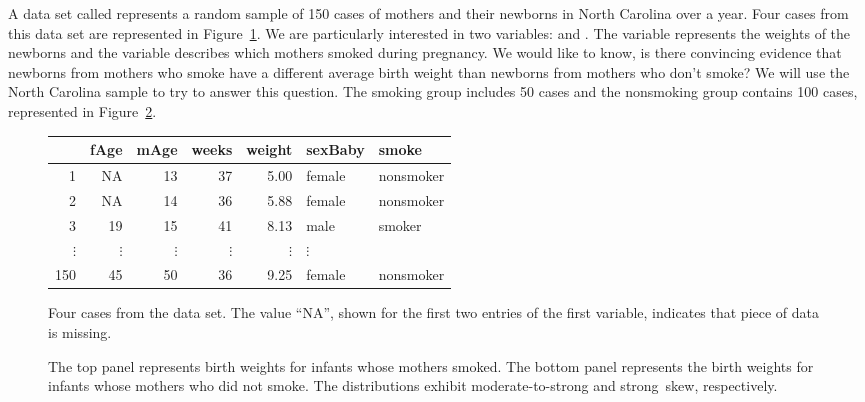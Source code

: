 
A data set called  represents a random sample of 150 cases of mothers and their newborns in North Carolina over a year. Four cases from this data set are represented in Figure~\ref{babySmokeDF}. We are particularly interested in two variables:  and . The  variable represents the weights of the newborns and the  variable describes which mothers smoked during pregnancy. We would like to know, is there convincing evidence that newborns from mothers who smoke have a different average birth weight than newborns from mothers who don't smoke? We will use the North Carolina sample to try to answer this question. The smoking group includes 50 cases and the nonsmoking group contains 100 cases, represented in Figure~\ref{babySmokePlotOfTwoGroupsToExamineSkew}.

\begin{figure}[h]
\centering
\begin{tabular}{rrrrrll}
  \hline
 & fAge & mAge & weeks & weight & sexBaby & smoke \\ 
  \hline
1 & NA & 13 &  37 & 5.00 & female & nonsmoker \\ 
  2 & NA & 14 &  36 & 5.88 & female & nonsmoker \\ 
  3 & 19 & 15 &  41 & 8.13 & male & smoker \\ 
  $\vdots$ &   $\vdots$ &   $\vdots$ &   $\vdots$ &   $\vdots$ &   $\vdots$ \\
  150 & 45 & 50 &  36 & 9.25 & female & nonsmoker \\ 
   \hline
\end{tabular}
\caption{Four cases from the  data set. The value ``NA'', shown for the first two entries of the first variable, indicates that piece of data is missing.}
\label{babySmokeDF}
\end{figure}

\begin{figure}[hhh]
  \centering
  \caption{The top panel represents birth weights for infants
      whose mothers smoked.
      The bottom panel represents the birth weights for
      infants whose mothers who did not smoke.
      The distributions exhibit moderate-to-strong and
      strong~skew, respectively.%
      }
  \label{babySmokePlotOfTwoGroupsToExamineSkew}
\end{figure}

